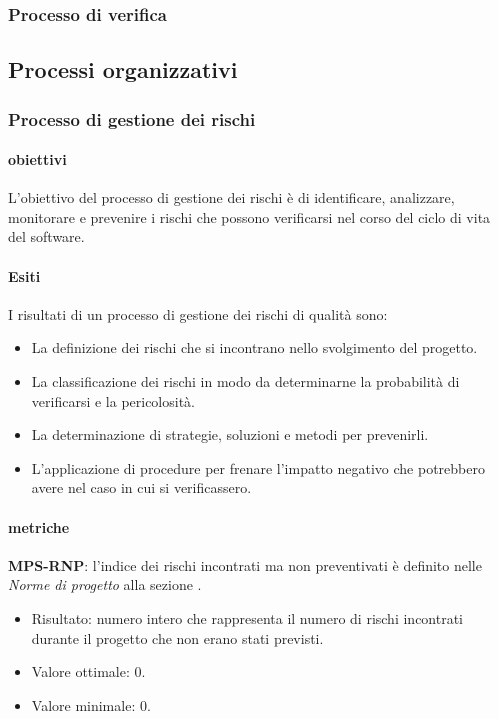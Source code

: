 \documentclass[../piano-di-qualifica.tex]{subfiles}
\begin{document}
\subsubsection{Processo di verifica}%
\label{subs:processo_di_verifica}

\subsection{Processi organizzativi}%
\label{sub:processi_organizzativi}

\subsubsection{Processo di gestione dei rischi}%
\label{sub:processo_di_gestione_dei_rischi}

\paragraph{obiettivi}
\label{par:obiettivi}

L'obiettivo del processo di gestione dei rischi è di identificare, analizzare, monitorare e prevenire i rischi che possono verificarsi nel corso del ciclo di vita del software.

\paragraph{Esiti}
\label{par:esiti}

I risultati di un processo di gestione dei rischi di qualità sono:
\begin{itemize}
  \item La definizione dei rischi che si incontrano nello svolgimento del progetto.
  \item La classificazione dei rischi in modo da determinarne la probabilità di verificarsi e la pericolosità.
    \item La determinazione di strategie, soluzioni e metodi per prevenirli.
    \item L'applicazione di procedure per frenare l'impatto negativo che potrebbero avere nel caso in cui si verificassero.
\end{itemize}

\paragraph{metriche}%
\label{par:metriche}

\textbf{MPS-RNP}: l'indice dei rischi incontrati ma non preventivati è definito nelle \textit{Norme di progetto} alla sezione .
\begin{itemize}
  \item Risultato: numero intero che rappresenta il numero di rischi incontrati durante il progetto che non erano stati previsti.
  \item Valore ottimale: 0.
  \item Valore minimale: 0.
\end{itemize}
\end{document}
